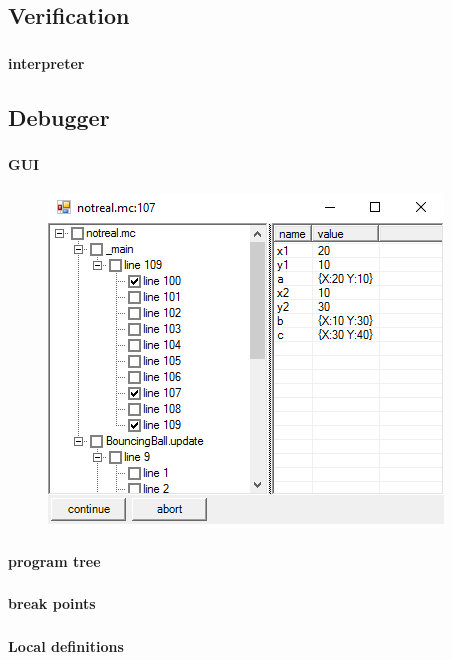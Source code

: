 \subsection{Verification}
\begin{frame}
    \frametitle{\subsecname}
    \framesubtitle{interpreter}
\end{frame}

\subsection{Debugger}

\begin{frame}
    \frametitle{\subsecname}
    \framesubtitle{GUI}
    \begin{figure}
        \includegraphics[scale=0.5]{debugger}
    \end{figure}
\end{frame}

\begin{frame}
    \frametitle{\subsecname}
    \framesubtitle{program tree}
\end{frame}

\begin{frame}
    \frametitle{\subsecname}
    \framesubtitle{break points}
\end{frame}

\begin{frame}
    \frametitle{\subsecname}
    \framesubtitle{Local definitions}
\end{frame}

